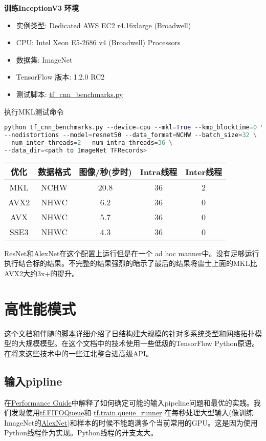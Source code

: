 \textbf{训练InceptionV3}\newline
\textbf{环境}
\begin{itemize}
	\item 实例类型: Dedicated AWS EC2 r4.16xlarge (Broadwell)
	\item CPU: Intel Xeon E5-2686 v4 (Broadwell) Processors
	\item 数据集: ImageNet
	\item TensorFlow 版本: 1.2.0 RC2
	\item 测试脚本: \href{https://github.com/tensorflow/benchmarks/blob/mkl_experiment/scripts/tf_cnn_benchmarks/tf_cnn_benchmarks.py}{tf\_cnn\_benchmarks.py}
\end{itemize}

执行MKL测试命令
\begin{lstlisting}[language=Python]
python tf_cnn_benchmarks.py --device=cpu --mkl=True --kmp_blocktime=0 \
--nodistortions --model=resnet50 --data_format=NCHW --batch_size=32 \
--num_inter_threads=2 --num_intra_threads=36 \
--data_dir=<path to ImageNet TFRecords>
\end{lstlisting}
\begin{tabular}{|c|c|c|c|c|}
\hline
优化&数据格式&图像/秒(步时)&Intra线程&Inter线程\\
\hline
MKL&	NCHW&	20.8&	36&	2\\
\hline
AVX2&	NHWC&	6.2&	36&	0\\
\hline
AVX&	NHWC&	5.7&	36&	0\\
\hline
SSE3&	NHWC&	4.3&	36&	0\\
\hline
\end{tabular}
ResNet和AlexNet在这个配置上运行但是在一个 ad hoc manner中。没有足够运行执行结合标的结果。不完整的结果强烈的暗示了最后的结果将雷士上面的MKL比AVX2大约3x+的提升。
\section{高性能模式}
这个文档和伴随的\href{https://github.com/tensorflow/benchmarks/tree/master/scripts/tf_cnn_benchmarks}{脚本}详细介绍了日结构建大规模的针对多系统类型和网络拓扑模型的大规模模型。在这个文档中的技术使用一些低级的TensorFlow Python原语。在将来这些技术中的一些江北整合进高级API。
\subsection{输入pipline}
在\href{https://www.tensorflow.org/performance/performance_guide}{Performance Guide}中解释了如何确定可能的输入pipeline问题和最优的实践。我们发现使用\href{https://www.tensorflow.org/api_docs/python/tf/FIFOQueue}{tf.FIFOQueue}和 \href{https://www.tensorflow.org/api_docs/python/tf/train/queue_runner}{tf.train.queue\_runner} 在每秒处理大型输入(像训练ImageNet的\href{http://papers.nips.cc/paper/4824-imagenet-classification-with-deep-convolutional-neural-networks.pdf}{AlexNet})和样本的时候不能跑满多个当前常用的GPU。这是因为使用Python线程作为实现。Python线程的开支太大。

